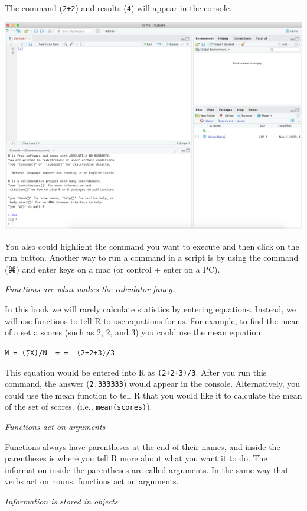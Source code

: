 \documentclass[
]{book}
\begin{document}
The command (\texttt{2+2}) and results (\texttt{4}) will appear in the console.

\includegraphics{img/NAVIGATING AND COMMANDS R19.png}

You also could highlight the command you want to execute and then click on the run button. Another way to run a command in a script is by using the command (⌘) and enter keys on a mac (or control + enter on a PC).

\emph{Functions are what makes the calculator fancy.}

In this book we will rarely calculate statistics by entering equations. Instead, we will use functions to tell R to use equations for us. For example, to find the mean of a set a scores (such as 2, 2, and 3) you could use the mean equation:

\texttt{M\ =\ (∑X)/N\ \ =\ =\ \ (2+2+3)/3}

This equation would be entered into R as \texttt{(2+2+3)/3}. After you run this command, the answer (\texttt{2.333333}) would appear in the console. Alternatively, you could use the mean function to tell R that you would like it to calculate the mean of the set of scores. (i.e., \texttt{mean(scores)}).

\emph{Functions act on arguments}

Functions always have parentheses at the end of their names, and inside the parentheses is where you tell R more about what you want it to do. The information inside the parentheses are called arguments. In the same way that verbs act on nouns, functions act on arguments.

\emph{Information is stored in objects}
\end{document}
